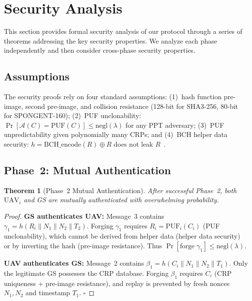 \documentclass[11pt,a4paper]{article}
\newtheorem{theorem}{Theorem}
\begin{document}
\section{Security Analysis}
\label{sec:security}

This section provides formal security analysis of our protocol through a series of theorems addressing the key security properties. We analyze each phase independently and then consider cross-phase security properties.

\subsection{Assumptions}

The security proofs rely on four standard assumptions: (1)~hash function pre-image, second pre-image, and collision resistance (128-bit for SHA3-256, 80-bit for SPONGENT-160); (2)~PUF unclonability: $\Pr[\mathcal{A}(C) = \text{PUF}(C)] \leq \text{negl}(\lambda)$ for any PPT adversary; (3)~PUF unpredictability given polynomially many CRPs; and (4)~BCH helper data security: $h = \text{BCH\_encode}(R) \oplus R$ does not leak $R$~\cite{bch_puf_extraction}.

\subsection{Phase~2: Mutual Authentication}

\begin{theorem}[Phase~2 Mutual Authentication]
\label{thm:mutual_auth}
After successful Phase~2, both $\text{UAV}_i$ and GS are mutually authenticated with overwhelming probability.
\end{theorem}

\begin{proof}
\textbf{GS authenticates UAV:} Message~3 contains $\gamma_1 = h(R_i \| N_1 \| N_2 \| T_2)$. Forging $\gamma_1$ requires $R_i = \text{PUF}_i(C_i)$ (PUF unclonability), which cannot be derived from helper data (helper data security) or by inverting the hash (pre-image resistance). Thus $\Pr[\text{forge } \gamma_1] \leq \text{negl}(\lambda)$.

\textbf{UAV authenticates GS:} Message~2 contains $\beta_1 = h(C_i \| N_1 \| N_2 \| T_1)$. Only the legitimate GS possesses the CRP database. Forging $\beta_1$ requires $C_i$ (CRP uniqueness + pre-image resistance), and replay is prevented by fresh nonces $N_1, N_2$ and timestamp $T_1$. \hfill$\square$
\end{proof}
\end{document}

